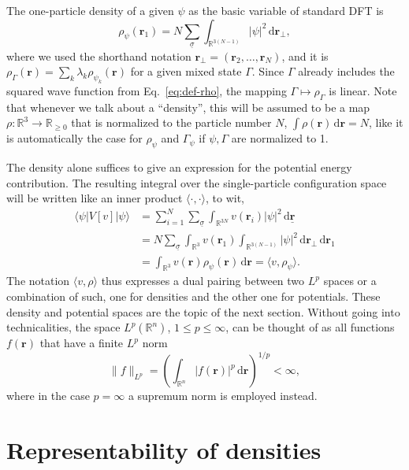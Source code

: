 \documentclass[journal=apcach,manuscript=article,layout=twocolumn]{achemso}
\newcommand{\R}{\mathbb{R}}
\renewcommand{\d}{\,\mathrm{d}} %
\newcommand{\rr}{\mathbf{r}}
\newcommand{\rrN}{\underline{\mathbf{r}}}
\newcommand{\rrtwotoN}{\mathbf{r}_\perp}
\newcommand{\sigmaN}{\underline{\sigma}}
\begin{document}
The one-particle density of a given $\psi$ as the basic variable of standard DFT is
\begin{equation}\label{eq:def-rho}
\rho_\psi(\rr_1) = N \sum_{\sigmaN} \int_{\R^{3(N-1)}} |\psi|^2 \d \rrtwotoN,
\end{equation}
where we used the shorthand notation $\rrtwotoN=(\rr_2,\dots,\rr_N)$, and it is
$\rho_\Gamma(\rr) = \sum_k \lambda_k \rho_{\psi_k}(\rr)$ for a given mixed state $\Gamma$. Since $\Gamma$ already includes the squared wave function from Eq.~\eqref{eq:def-rho}, the mapping $\Gamma \mapsto \rho_\Gamma$ is linear. Note that whenever we talk about a ``density'', this will be assumed to be a map $\rho:\R^3 \to \R_{\geq 0}$ that is normalized to the particle number $N$, $\int\rho(\rr) \d\rr=N$, like it is automatically the case for $\rho_\psi$ and $\Gamma_\psi$ if $\psi,\Gamma$ are normalized to 1.

The density alone suffices to give an expression for the potential energy contribution. The resulting integral over the single-particle configuration space will be written like an inner product $\langle \cdot, \cdot \rangle$, to wit,
\begin{equation}\label{eq:v-rho-pairing}
\begin{aligned}
    \langle \psi| V[v] | \psi \rangle &= \sum_{i=1}^N \sum_{\sigmaN} \int_{\R^{3N}} v(\rr_i) |\psi|^2 \d \rrN \\
    &= N \sum_{\sigmaN} \int_{\R^3} v(\rr_1) \int_{\R^{3(N-1)}} |\psi|^2 \d \rrtwotoN \d \rr_1\\
    &= \int_{\R^3} v(\rr)\rho_\psi(\rr) \d \rr = \langle v,\rho_\psi \rangle.
\end{aligned}
\end{equation}
%
The notation $\langle v,\rho \rangle$ thus expresses a dual pairing between two $L^p$ spaces or a combination of such, one for densities and the other one for potentials. These density and potential spaces are the topic of the next section. Without going into technicalities, the space $L^p(\R^n)$, $1\leq p \leq \infty$, can be thought of as all functions $f(\rr)$ that have a finite $L^p$ norm
\begin{equation*}
    \|f\|_{L^p} = \left( \int_{\R^n} |f(\rr)|^p \d\rr \right)^{1/p} < \infty,
\end{equation*}
where in the case $p=\infty$ a supremum norm is employed instead.

\section{Representability of densities}
\label{sec:rep}
\end{document}
